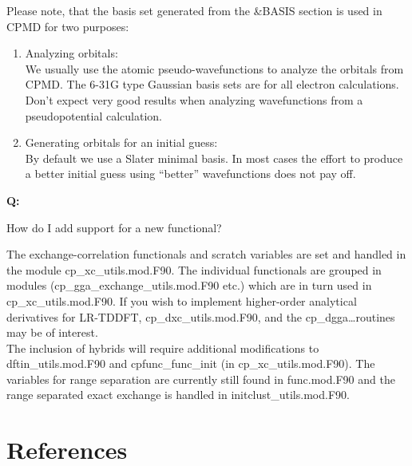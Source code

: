 \documentclass[twoside,10pt,titlepage,a4paper]{article}
\newcommand{\reflabel}[1]{\hypertarget{#1}}
\newcommand{\reflabel}[1]{\label{#1}}
\newcommand{\faqquestion}[1]{\vspace{2ex}\reflabel{faq#1}{{\bf Q:\ }}}
\newcommand{\faqanswer}{\vspace{1ex}{{\bf A:\ }}}
\begin{document}
Please note, that the basis set generated from the \&BASIS
section is used in CPMD for two purposes:
\begin{enumerate}
\item Analyzing orbitals:\\
   We usually use the atomic pseudo-wavefunctions to analyze
   the orbitals from CPMD. The 6-31G type Gaussian basis
   sets are for all electron calculations. Don't expect
   very good results when analyzing wavefunctions from a
   pseudopotential calculation.
\item Generating orbitals for an initial guess:\\
   By default we use a Slater minimal basis. In most
   cases the effort to produce a better initial guess
   using ``better'' wavefunctions does not pay off.
\end{enumerate}
%

\faqquestion{newdft}
How do I add support for a new functional?

\faqanswer
The exchange-correlation functionals and scratch variables
are set and handled in the module
cp\_xc\_utils.mod.F90. The individual functionals are grouped in modules
(cp\_gga\_exchange\_utils.mod.F90 etc.{}) which are in turn used in
cp\_xc\_utils.mod.F90. If you wish to implement higher-order analytical derivatives
for LR-TDDFT, cp\_dxc\_utils.mod.F90, and the cp\_dgga\dots routines may be of interest. \\
The inclusion of hybrids will require additional modifications to dftin\_utils.mod.F90 and
cpfunc\_func\_init (in cp\_xc\_utils.mod.F90). The variables for
range separation are currently still found in func.mod.F90 and the range separated exact exchange
is handled in initclust\_utils.mod.F90.
%

\cleardoublepage
%

\section*{References}
\renewcommand{\refname}{}
\end{document}
